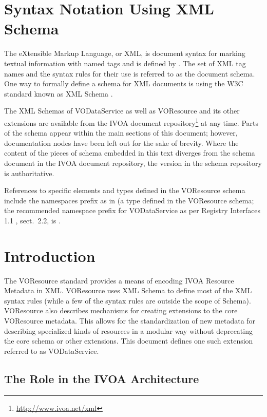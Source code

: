 \documentclass[11pt,a4paper]{ivoa}
\begin{document}
\section*{Syntax Notation Using XML Schema}

The eXtensible Markup Language, or XML, is document syntax for marking
textual information with named tags and is defined by \citet{std:XML}.
The set of XML tag names and the syntax
rules for their use is referred to as the document schema.  One way to
formally define a schema for XML documents is using the W3C standard
known as XML Schema \citep{std:XSD}.

The XML Schemas of VODataService as well as VOResource and its other
extensions are
available from the IVOA document
repository\footnote{\url{http://www.ivoa.net/xml}} at any time.
Parts of the schema appear within the main sections of this document;
however, documentation nodes have been left out for the sake of brevity.
Where the content of the pieces of schema embedded in this text
diverges from the schema document in the IVOA document
repository, the version in the schema repository is authoritative.

References to specific elements and types defined in the VOResource
schema include the namespaces prefix  as in
 (a type defined in the VOResource schema; the
recommended namespace prefix for VODataService as per Registry
Interfaces 1.1 \citep{registry interfaces 1.1}, sect.~2.2, is .

\section{Introduction}

The VOResource standard \citep{2008ivoa.spec.0222P} provides a means of
encoding IVOA Resource Metadata in XML.
VOResource uses XML Schema \citep{std:XSD} to define
most of the XML syntax rules (while a few of the syntax rules are
outside the scope of Schema).  VOResource also describes mechanisms
for creating extensions to the core VOResource metadata.  This allows
for the standardization of new metadata for describing specialized
kinds of resources in a modular way without deprecating the core
schema or other extensions.  This document defines one such extension
referred to as VODataService.

\subsection{The Role in the IVOA Architecture}
\end{document}
